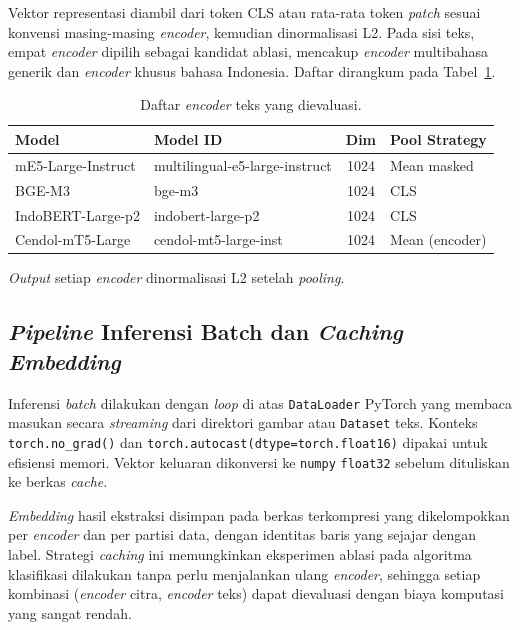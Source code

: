 Vektor representasi diambil dari token CLS atau rata-rata token \textit{patch} sesuai konvensi masing-masing \textit{encoder}, kemudian dinormalisasi L2. Pada sisi teks, empat \textit{encoder} dipilih sebagai kandidat ablasi, mencakup \textit{encoder} multibahasa generik dan \textit{encoder} khusus bahasa Indonesia. Daftar dirangkum pada Tabel~\ref{tab:text-encoders}.

\begin{table}[htbp]
\centering
\caption{Daftar \textit{encoder} teks yang dievaluasi.}
\label{tab:text-encoders}
\small
\begin{tabular}{p{3.2cm} p{5.0cm} c p{2.8cm}}
\toprule
\textbf{Model} & \textbf{Model ID} & \textbf{Dim} & \textbf{Pool Strategy} \\
\midrule
mE5-Large-Instruct & multilingual-e5-large-instruct & 1024 & Mean masked \\
BGE-M3 & bge-m3 & 1024 & CLS \\
IndoBERT-Large-p2 & indobert-large-p2 & 1024 & CLS \\
Cendol-mT5-Large & cendol-mt5-large-inst & 1024 & Mean (encoder) \\
\bottomrule
\end{tabular}
\end{table}

\textit{Output} setiap \textit{encoder} dinormalisasi L2 setelah \textit{pooling}.

\subsection{\textit{Pipeline} Inferensi Batch dan \textit{Caching Embedding}}

Inferensi \textit{batch} dilakukan dengan \textit{loop} di atas \texttt{DataLoader} PyTorch yang membaca masukan secara \textit{streaming} dari direktori gambar atau \texttt{Dataset} teks. Konteks \texttt{torch.no\_grad()} dan \texttt{torch.autocast(dtype=torch.float16)} dipakai untuk efisiensi memori. Vektor keluaran dikonversi ke \texttt{numpy} \texttt{float32} sebelum dituliskan ke berkas \textit{cache}.

\textit{Embedding} hasil ekstraksi disimpan pada berkas terkompresi yang dikelompokkan per \textit{encoder} dan per partisi data, dengan identitas baris yang sejajar dengan label. Strategi \textit{caching} ini memungkinkan eksperimen ablasi pada algoritma klasifikasi dilakukan tanpa perlu menjalankan ulang \textit{encoder}, sehingga setiap kombinasi (\textit{encoder} citra, \textit{encoder} teks) dapat dievaluasi dengan biaya komputasi yang sangat rendah.

